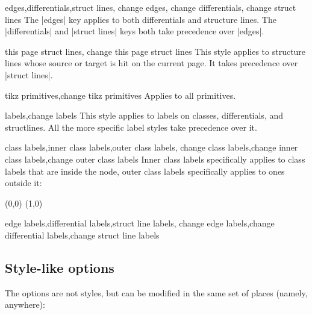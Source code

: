 \begin{sseqdata}[|| name = ex1, cohomological Serre grading]
\begin{stylekeylist}{edges,differentials,struct lines, change edges, change differentials, change struct lines}
The |edges| key applies to both differentials and structure lines. The |differentials| and |struct lines| keys both take precedence over |edges|.
\end{stylekeylist}

\begin{stylekeylist}{this page struct lines, change this page struct lines}
This style applies to structure lines whose source or target is hit on the current page. It takes precedence over |struct lines|.
\end{stylekeylist}

\begin{stylekeylist}{tikz primitives,change tikz primitives}
Applies to all \tikzpkg\space primitives.
\end{stylekeylist}


\begin{stylekeylist}{labels,change labels}
This style applies to labels on classes, differentials, and structlines. All the more specific label styles take precedence over it.
\end{stylekeylist}

\begin{stylekeylist}{class labels,inner class labels,outer class labels,
                change class labels,change inner class labels,change outer class labels}
Inner class labels specifically applies to class labels that are inside the node, outer class labels specifically applies to ones outside it:
\begin{codeexample}[]
\begin{sseqpage}[ no axes, classes = { inner sep = 1pt },
    label distance=2pt,
    outer class labels = { red },
    inner class labels = { blue } ]
\class["a", "b" above](0,0)
\class["a", "c" right](1,0)
\end{sseqpage}
\end{codeexample}
\end{stylekeylist}

\begin{stylekeylist}{edge labels,differential labels,struct line labels,
                change edge labels,change differential labels,change struct line labels}

\end{stylekeylist}


\subsection{Style-like options}
The options are not styles, but can be modified in the same set of places (namely, anywhere):


\end{sseqdata}

